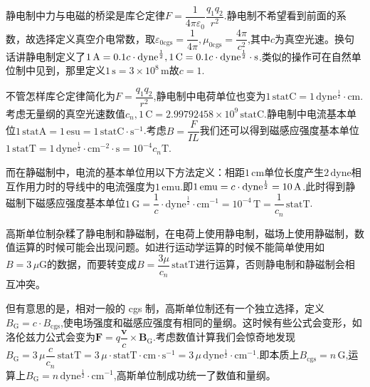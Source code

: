 \documentclass[../天体物理基础.tex]{subfiles}
\begin{document}
静电制中力与电磁的桥梁是库仑定律$F=\dfrac{1}{4\pi\varepsilon_{0}}\dfrac{q_{1}q_{2}}{r^{2}}$.静电制不希望看到前面的系数，故选择定义真空介电常数，取$\varepsilon_{0\text{cgs}}=\dfrac{1}{4\pi},\mu_{0\text{cgs}}=\dfrac{4\pi}{c^{2}}$,其中$c$为真空光速。换句话讲静电制定义了$1\,\mathrm{A}=0.1c\cdot\mathrm{dyne}^{\frac12},1\,\mathrm{C}=0.1c\cdot\rm{dyne}^{\frac12}\cdot s$.类似的操作可在自然单位制中见到，那里定义$1\,\mathrm{s}=3\times10^{8}\,\mathrm{m}$故$c=1$.

不管怎样库仑定律简化为$F=\dfrac{q_{1}q_{2}}{r^{2}}$,静电制中电荷单位也变为$1\,\mathrm{statC}=1\,\mathrm{dyne^{\frac12}\cdot cm}$.考虑无量纲的真空光速数值$c_{n},1\,\mathrm{C}=2.99792458\times10^{9}\,\mathrm{statC}$.静电制中电流基本单位$1\,\mathrm{statA}=1\,\mathrm{esu}=1\,\mathrm{statC\cdot{}s^{-1}}$.考虑$B=\dfrac{F}{IL}$我们还可以得到磁感应强度基本单位$1\,\mathrm{statT}=1\,\mathrm{dyne^{\frac{1}{2}}\cdot cm^{-2}\cdot s}=10^{-4}c_{n}\mathrm{T}$.

而在静磁制中，电流的基本单位用以下方法定义：相距$1\,\mathrm{cm}$单位长度产生$2\,\mathrm{dyne}$相互作用力时的导线中的电流强度为$1\,\mathrm{emu}$.即$1\,\mathrm{emu}=c\cdot\rm dyne^{\frac12}=10\,\mathrm{A}$.此时得到静磁制下磁感应强度基本单位$1\,\mathrm{G}=\dfrac{1}{c}\cdot\mathrm{dyne}^{\frac12}\cdot\mathrm{cm}^{-1}=10^{-4}\,\mathrm{T}=\dfrac1{c_{n}}\,\mathrm{statT}$.

高斯单位制杂糅了静电制和静磁制，在电荷上使用静电制，磁场上使用静磁制，数值运算的时候可能会出现问题。如进行运动学运算的时候不能简单使用如$B=3\,\mu\mathrm{G}$的数据，而要转变成$B=\dfrac{3\mu}{c_{n}}\,\mathrm{statT}$进行运算，否则静电制和静磁制会相互冲突。

但有意思的是，相对一般的 cgs 制，高斯单位制还有一个独立选择，定义$B_{\text{G}}=c\cdot B_{\text{cgs}}$,使电场强度和磁感应强度有相同的量纲。这时候有些公式会变形，如洛伦兹力公式会变为$\boldsymbol{F}=q\dfrac{\boldsymbol{v}}c\times\boldsymbol{B}_{\text{G}}$.考虑数值计算我们会惊奇地发现$B_{\text{G}}=3\,\mu\dfrac{c}{c_{n}}\,\mathrm{statT}=3\,\mu\cdot\mathrm{statT}\cdot\mathrm{cm\cdot{}s^{-1}}=3\,\mu\,\mathrm{dyne^{\frac{1}{2}}}\cdot\mathrm{cm}^{-1}$.即本质上$B_{\text{cgs}}=n\,\mathrm{G}$,运算上$B_{\text{G}}=n\,\mathrm{dyne^{\frac{1}{2}}\cdot cm^{-1}}$,高斯单位制成功统一了数值和量纲。
\end{document}
